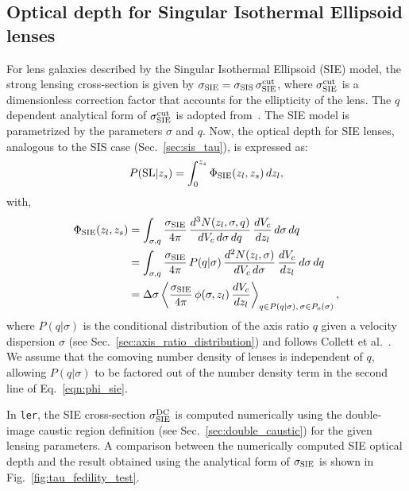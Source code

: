 \documentclass[aps,prd,twocolumn,superscriptaddress,groupedaddress,nofootinbib,showpacs,eqsecnum]{revtex4-1}
\begin{document}
\subsection{Optical depth for Singular Isothermal Ellipsoid lenses}\label{sec:sie_tau_1}

For lens galaxies described by the Singular Isothermal Ellipsoid (SIE) model, the strong lensing cross-section is given by $\sigma_{\rm SIE} = \sigma_{\rm SIS} \, \sigma_{\rm SIE}^{\rm cut}$, where $\sigma_{\rm SIE}^{\rm cut}$ is a dimensionless correction factor that accounts for the ellipticity of the lens. The $q$ dependent analytical form of $\sigma_{\rm SIE}^{\rm cut}$ is adopted from~\cite{feixu2022,Kormann1994}. The SIE model is parametrized by the parameters $\sigma$ and $q$. Now, the optical depth for SIE lenses, analogous to the SIS case (Sec.~\ref{sec:sis_tau}), is expressed as:
\begin{align}
P({\rm SL}|z_s) = \int_0^{z_s} \Phi_{\rm SIE}(z_l, z_s) \, dz_l,
\label{eqn:sie_1}\end{align}
with,
\begin{align}
\Phi_{\rm SIE}(z_l, z_s) &= \int_{\sigma,q} \frac{\sigma_{\rm SIE}}{4\pi} \, \frac{d^3N(z_l, \sigma, q)}{dV_c \, d\sigma \, dq} \, \frac{dV_c}{dz_l} \, d\sigma \, dq \\
                         &= \int_{\sigma,q} \frac{\sigma_{\rm SIE}}{4\pi} \, P(q|\sigma) \, \frac{d^2N(z_l, \sigma)}{dV_c \, d\sigma} \, \frac{dV_c}{dz_l} \, d\sigma \, dq \\
                         &= \Delta \sigma \left\langle \frac{\sigma_{\rm SIE}}{4\pi} \, \phi(\sigma, z_l) \, \frac{dV_c}{dz_l} \right\rangle_{q \in P(q|\sigma), \, \sigma \in P_o(\sigma)},
\label{eqn:phi_sie}\end{align}
where $P(q|\sigma)$ is the conditional distribution of the axis ratio $q$ given a velocity dispersion $\sigma$ (see Sec.~\ref{sec:axis_ratio_distribution}) and follows Collett et al.~\cite{Collett2015}. We assume that the comoving number density of lenses is independent of $q$, allowing $P(q|\sigma)$ to be factored out of the number density term in the second line of Eq.~\eqref{eqn:phi_sie}.

In \texttt{ler}, the SIE cross-section $\sigma^{\rm DC}_{\rm SIE}$ is computed numerically using the double-image caustic region definition (see Sec.~\ref{sec:double_caustic}) for the given lensing parameters. A comparison between the numerically computed SIE optical depth and the result obtained using the analytical form of $\sigma_{\rm SIE}$ is shown in Fig.~\ref{fig:tau_fedility_test}.
\end{document}
